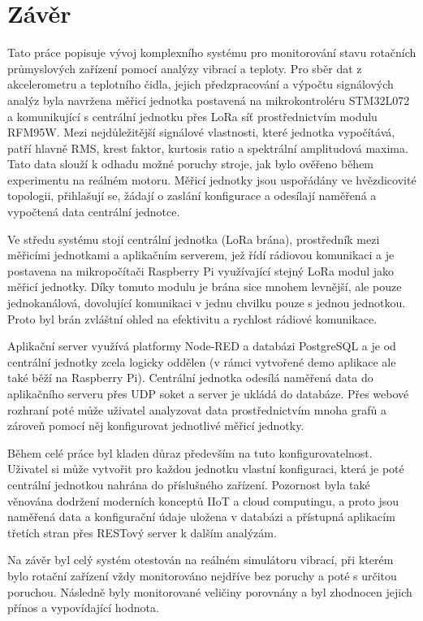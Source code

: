 \chapter{Závěr}
    Tato práce popisuje vývoj komplexního systému pro monitorování stavu rotačních průmyslových zařízení pomocí analýzy vibrací a teploty.
    Pro sběr dat z akcelerometru a teplotního čidla, jejich předzpracování a výpočtu signálových analýz byla navržena měřicí jednotka postavená na mikrokontroléru STM32L072 a komunikující s centrální jednotku přes LoRa síť prostřednictvím modulu RFM95W. Mezi nejdůležitější signálové vlastnosti, které jednotka vypočítává, patří hlavně RMS, krest faktor, kurtosis ratio a spektrální amplitudová maxima. Tato data slouží k odhadu možné poruchy stroje, jak bylo ověřeno během experimentu na reálném motoru. Měřicí jednotky jsou uspořádány ve hvězdicovité topologii, přihlašují se, žádají o zaslání konfigurace a odesílají naměřená a vypočtená data centrální jednotce.
    
    Ve středu systému stojí centrální jednotka (LoRa brána), prostředník mezi měřicími jednotkami a aplikačním serverem, jež řídí rádiovou komunikaci a je postavena na mikropočítači Raspberry Pi využívající stejný LoRa modul jako měřicí jednotky. Díky tomuto modulu je brána sice mnohem levnější, ale pouze jednokanálová, dovolující komunikaci v jednu chvilku pouze s jednou jednotkou. Proto byl brán zvláštní ohled na efektivitu a rychlost rádiové komunikace.
    
    Aplikační server využívá platformy Node-RED a databázi PostgreSQL a je od centrální jednotky zcela logicky oddělen (v rámci vytvořené demo aplikace ale také běží na Raspberry Pi). Centrální jednotka odesílá naměřená data do aplikačního serveru přes UDP soket a server je ukládá do databáze. Přes webové rozhraní poté může uživatel analyzovat data prostřednictvím mnoha grafů a zároveň pomocí něj konfigurovat jednotlivé měřicí jednotky.
    
    Během celé práce byl kladen důraz především na tuto konfigurovatelnost. Uživatel si může vytvořit pro každou jednotku vlastní konfiguraci, která je poté centrální jednotkou nahrána do příslušného zařízení. Pozornost byla také věnována dodržení moderních konceptů IIoT a cloud computingu, a proto jsou naměřená data a konfigurační údaje uložena v databázi a přístupná aplikacím třetích stran přes RESTový server k dalším analýzám.
    
    Na závěr byl celý systém otestován na reálném simulátoru vibrací, při kterém bylo rotační zařízení vždy monitorováno nejdříve bez poruchy a poté s určitou poruchou. Následně byly monitorované veličiny porovnány a byl zhodnocen jejich přínos a vypovídající hodnota.
    
